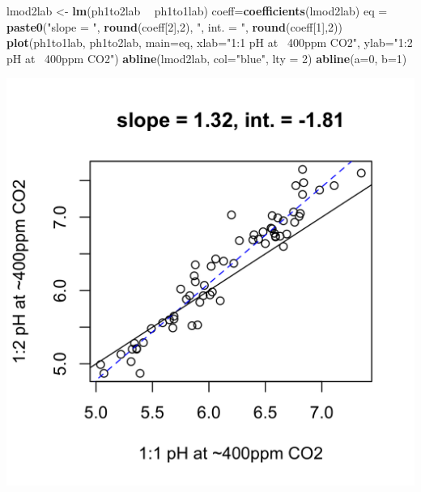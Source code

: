 \documentclass[]{article}
\newenvironment{Shaded}{\begin{snugshade}}{\end{snugshade}}
\newcommand{\DataTypeTok}[1]{\textcolor[rgb]{0.13,0.29,0.53}{#1}}
\newcommand{\DecValTok}[1]{\textcolor[rgb]{0.00,0.00,0.81}{#1}}
\newcommand{\KeywordTok}[1]{\textcolor[rgb]{0.13,0.29,0.53}{\textbf{#1}}}
\newcommand{\NormalTok}[1]{#1}
\newcommand{\OperatorTok}[1]{\textcolor[rgb]{0.81,0.36,0.00}{\textbf{#1}}}
\newcommand{\StringTok}[1]{\textcolor[rgb]{0.31,0.60,0.02}{#1}}
\begin{document}
\begin{Shaded}
\begin{Highlighting}[]
\NormalTok{lmod2lab <-}\StringTok{ }\KeywordTok{lm}\NormalTok{(ph1to2lab }\OperatorTok{~}\StringTok{ }\NormalTok{ph1to1lab)}
\NormalTok{coeff=}\KeywordTok{coefficients}\NormalTok{(lmod2lab)}
\NormalTok{eq =}\StringTok{ }\KeywordTok{paste0}\NormalTok{(}\StringTok{"slope = "}\NormalTok{, }\KeywordTok{round}\NormalTok{(coeff[}\DecValTok{2}\NormalTok{],}\DecValTok{2}\NormalTok{), }\StringTok{", int. = "}\NormalTok{, }\KeywordTok{round}\NormalTok{(coeff[}\DecValTok{1}\NormalTok{],}\DecValTok{2}\NormalTok{))}
\KeywordTok{plot}\NormalTok{(ph1to1lab, ph1to2lab, }\DataTypeTok{main=}\NormalTok{eq,}
   \DataTypeTok{xlab=}\StringTok{"1:1 pH at ~400ppm CO2"}\NormalTok{, }\DataTypeTok{ylab=}\StringTok{"1:2 pH at ~400ppm CO2"}\NormalTok{)}
\KeywordTok{abline}\NormalTok{(lmod2lab, }\DataTypeTok{col=}\StringTok{"blue"}\NormalTok{, }\DataTypeTok{lty =} \DecValTok{2}\NormalTok{)}
\KeywordTok{abline}\NormalTok{(}\DataTypeTok{a=}\DecValTok{0}\NormalTok{, }\DataTypeTok{b=}\DecValTok{1}\NormalTok{)}
\end{Highlighting}
\end{Shaded}

\includegraphics{output-rmd/whitman-figure-request-2-lab-wisc-1.png}
\end{document}
